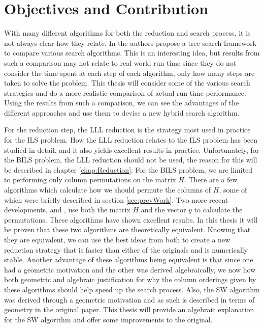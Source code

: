 \documentclass[12pt,Bold,letterpaper]{mcgilletdclass}
\begin{document}
\section{Objectives and Contribution}
With many different algorithms for both the reduction and search process, it is not always clear how they relate. In \cite{MurGDC06} the authors propose a tree search framework to compare various search algorithms. This is an interesting idea, but results from such a comparison may not relate to real world run time since they do not consider the time spent at each step of each algorithm, only how many steps are taken to solve the problem. This thesis will consider some of the various search strategies and do a more realistic comparison of actual run time performance. Using the results from such a comparison, we can see the advantages of the different approaches and use them to devise a new hybrid search algorithm.

For the reduction step, the LLL reduction \cite{LenLL82} is the strategy most used in practice for the ILS problem. How the LLL reduction relates to the ILS problem has been studied in detail, and it also yields excellent results in practice. Unfortunately, for the BILS problem, the LLL reduction should not be used, the reason for this will be described in chapter \ref{chap:Reduction}. For the BILS problem, we are limited to performing only column permutations on the matrix $H$. There are a few algorithms which calculate how we should permute the columns of $H$, some of which were briefly described in section \ref{sec:prevWork}. Two more recent developments, \cite{ChaH05} and \cite{SuW05}, use both the matrix $H$ and the vector $y$ to calculate the permutations. These algorithms have shown excellent results. In this thesis it will be proven that these two algorithms are theoretically equivalent. Knowing that they are equivalent, we can use the best ideas from both to create a new reduction strategy that is faster than either of the originals and is numerically stable. Another advantage of these algorithms being equivalent is that since one had a geometric motivation and the other was derived algebraically, we now how both geometric and algebraic justification for why the column orderings given by these algorithms should help speed up the search process. Also, the SW algorithm was derived through a geometric motivation and as such is described in terms of geometry in the original paper. This thesis will provide an algebraic explanation for the SW algorithm and offer some improvements to the original.
\end{document}
